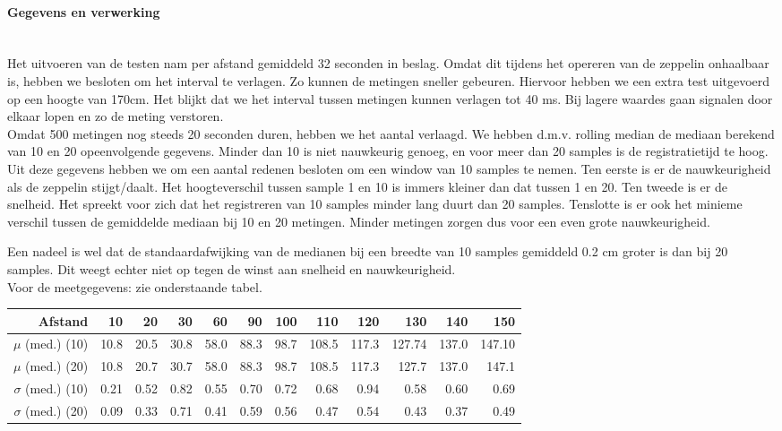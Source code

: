 \documentclass[tt]{penoverslag}
\begin{document}
\paragraph{Gegevens en verwerking} ~\\ 
Het uitvoeren van de testen nam per afstand gemiddeld 32 seconden in beslag. Omdat dit tijdens het opereren van de zeppelin onhaalbaar is, hebben we besloten om het interval te verlagen. Zo kunnen de metingen sneller gebeuren. Hiervoor hebben we een extra test uitgevoerd op een hoogte van 170cm. Het blijkt dat we het interval tussen metingen kunnen verlagen tot 40 ms. Bij lagere waardes gaan signalen door elkaar lopen en zo de meting verstoren. \\

Omdat 500 metingen nog steeds 20 seconden duren, hebben we het aantal verlaagd. We hebben d.m.v. rolling median de mediaan berekend van 10 en 20 opeenvolgende gegevens. Minder dan 10 is niet nauwkeurig genoeg, en voor meer dan 20 samples is de registratietijd te hoog. Uit deze gegevens hebben we om een aantal redenen besloten om een window van 10 samples te nemen.  Ten eerste is er de nauwkeurigheid als de zeppelin stijgt/daalt. Het hoogteverschil tussen sample 1 en 10 is immers kleiner dan dat tussen 1 en 20. Ten tweede is er de snelheid. Het spreekt voor zich dat het registreren van 10 samples minder lang duurt dan 20 samples. Tenslotte is er ook het minieme verschil tussen de gemiddelde mediaan bij 10 en 20 metingen. Minder metingen zorgen dus voor een even grote nauwkeurigheid. 

Een nadeel is wel dat de standaardafwijking van de medianen bij een breedte van 10 samples gemiddeld 0.2 cm groter is dan bij 20 samples. Dit weegt echter niet op tegen de winst aan snelheid en nauwkeurigheid.\\ 

Voor de meetgegevens: zie onderstaande tabel. \\

\begin{tabular}{r||r|r|r|r|r|r|r|r|r|r|r}
\textbf{Afstand} & 10 & 20 & 30 & 60 & 90 & 100 & 110 & 120 & 130 & 140 & 150 \\
\hline \hline 
$\mu$ (med.) (10) & 10.8 & 20.5 & 30.8 & 58.0 & 88.3 & 98.7 & 108.5 & 117.3 & 127.74 & 137.0 & 147.10 \\
$\mu$ (med.) (20) & 10.8 & 20.7 & 30.7 & 58.0 & 88.3 & 98.7 & 108.5 & 117.3 & 127.7 & 137.0 & 147.1 \\
$\sigma$ (med.) (10) & 0.21 & 0.52 & 0.82 & 0.55 & 0.70 & 0.72 & 0.68 & 0.94 & 0.58 & 0.60 & 0.69 \\
$\sigma$ (med.) (20)& 0.09 & 0.33 & 0.71 & 0.41 & 0.59 & 0.56 & 0.47 & 0.54 & 0.43 & 0.37 & 0.49 \\
\end{tabular}
\end{document}
